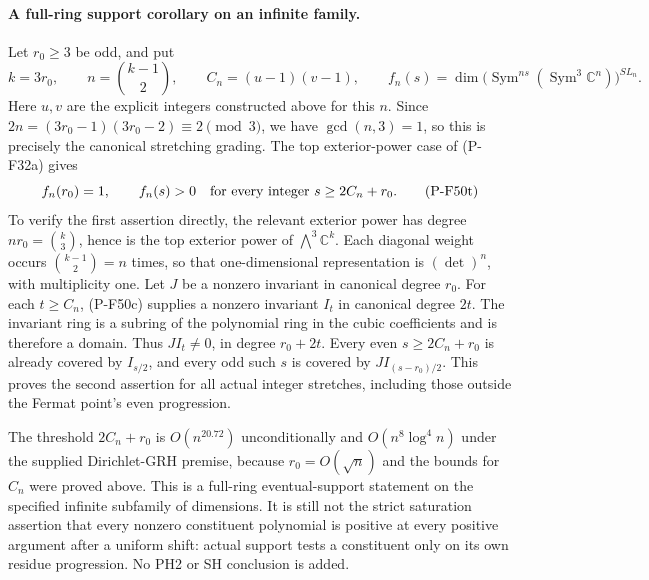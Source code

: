 \paragraph{A full-ring support corollary on an infinite family.}
Let $r_0\ge3$ be odd, and put
\[
       k=3r_0,\qquad n=\binom{k-1}{2},\qquad
       C_n=(u-1)(v-1),
       \qquad f_n(s)=\dim\bigl(\operatorname{Sym}^{ns}
                    (\operatorname{Sym}^3\mathbb C^n)\bigr)^{SL_n}.
                                                        \tag{P-F50s}
\]
Here $u,v$ are the explicit integers constructed above for this $n$.
Since $2n=(3r_0-1)(3r_0-2)\equiv2\pmod3$, we have
$\gcd(n,3)=1$, so this is precisely the canonical stretching
grading. The top exterior-power case of (P-F32a) gives
\[
               f_n(r_0)=1,
      \qquad f_n(s)>0\quad\hbox{for every integer }
                           s\ge2C_n+r_0.              \tag{P-F50t}
\]
To verify the first assertion directly, the relevant exterior
power has degree $nr_0=\binom{k}{3}$, hence is the top exterior
power of $\bigwedge^3\mathbb C^k$. Each diagonal weight occurs
$\binom{k-1}{2}=n$ times, so that one-dimensional representation
is $(\det)^n$, with multiplicity one. Let $J$ be a nonzero
invariant in canonical degree $r_0$. For each $t\ge C_n$,
(P-F50c) supplies a nonzero invariant $I_t$ in canonical
degree $2t$. The invariant ring is a subring of the polynomial
ring in the cubic coefficients and is therefore a domain.
Thus $JI_t\ne0$, in degree $r_0+2t$.
Every even $s\ge2C_n+r_0$ is already covered by $I_{s/2}$,
and every odd such $s$ is covered by $JI_{(s-r_0)/2}$.
This proves the second assertion for all actual integer stretches,
including those outside the Fermat point's even progression.

The threshold $2C_n+r_0$ is $O(n^{20.72})$ unconditionally
and $O(n^8\log^4 n)$ under the supplied Dirichlet-GRH premise,
because $r_0=O(\sqrt n)$ and the bounds for $C_n$ were proved
above. This is a full-ring eventual-support statement on the
specified infinite subfamily of dimensions. It is still not
the strict saturation assertion that every nonzero constituent
polynomial is positive at every positive argument after a
uniform shift: actual support tests a constituent only on its
own residue progression. No PH2 or SH conclusion is added.
